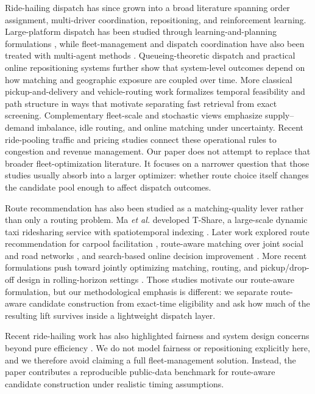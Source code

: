 \documentclass[journal]{IEEEtran}
\begin{document}
Ride-hailing dispatch has since grown into a broad literature spanning order assignment, multi-driver coordination, repositioning, and reinforcement learning. Large-platform dispatch has been studied through learning-and-planning formulations \cite{xu2018dispatch,tang2019deepvalue,tang2021value}, while fleet-management and dispatch coordination have also been treated with multi-agent methods \cite{lin2018fleet,zhou2019ovdm,jin2019coride}. Queueing-theoretic dispatch \cite{cheng2019queueing} and practical online repositioning systems \cite{xu2020reposition} further show that system-level outcomes depend on how matching and geographic exposure are coupled over time. More classical pickup-and-delivery and vehicle-routing work \cite{berbeglia2010dynamic,pillac2013dynamic,solomon1987vrptw,savelsbergh1995general} formalizes temporal feasibility and path structure in ways that motivate separating fast retrieval from exact screening. Complementary fleet-scale and stochastic views \cite{vazifeh2018fleet,bertsimas2019online,ozkan2020dynamic,braverman2019empty} emphasize supply--demand imbalance, idle routing, and online matching under uncertainty. Recent ride-pooling traffic and pricing studies \cite{ke2020ridepooling,karaenke2023expool} connect these operational rules to congestion and revenue management. Our paper does not attempt to replace that broader fleet-optimization literature. It focuses on a narrower question that those studies usually absorb into a larger optimizer: whether route choice itself changes the candidate pool enough to affect dispatch outcomes.

Route recommendation has also been studied as a matching-quality lever rather than only a routing problem. Ma \emph{et al.} developed T-Share, a large-scale dynamic taxi ridesharing service with spatiotemporal indexing \cite{ma2013tshare}. Later work explored route recommendation for carpool facilitation \cite{bassem2022}, route-aware matching over joint social and road networks \cite{xia2019}, and search-based online decision improvement \cite{chen2021}. More recent formulations push toward jointly optimizing matching, routing, and pickup/drop-off design in rolling-horizon settings \cite{stumpe2024}. Those studies motivate our route-aware formulation, but our methodological emphasis is different: we separate route-aware candidate construction from exact-time eligibility and ask how much of the resulting lift survives inside a lightweight dispatch layer.

Recent ride-hailing work has also highlighted fairness and system design concerns beyond pure efficiency \cite{suhr2019fair,shi2021fair,raman2021fair}. We do not model fairness or repositioning explicitly here, and we therefore avoid claiming a full fleet-management solution. Instead, the paper contributes a reproducible public-data benchmark for route-aware candidate construction under realistic timing assumptions.
\end{document}
